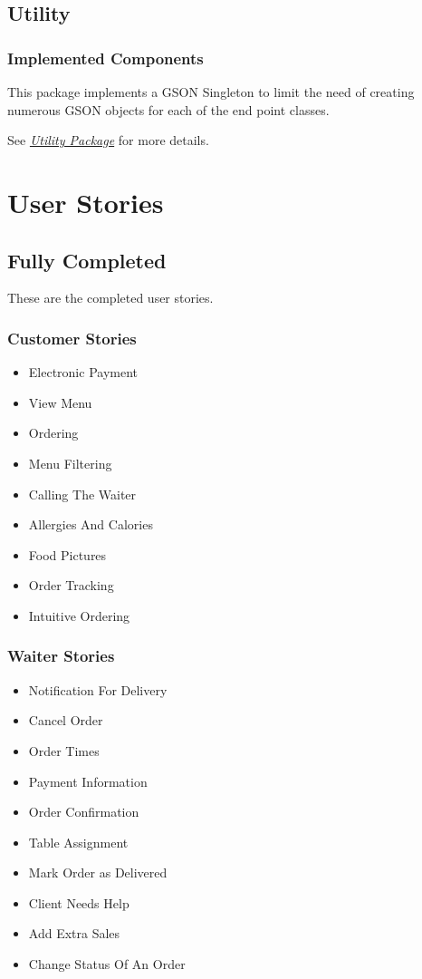 \documentclass[12pt, twoside, a4paper]{report}
\begin{document}
\section*{Utility}\label{sec:util}
\subsection*{Implemented Components}
This package implements a GSON Singleton to limit the need of creating numerous GSON objects for each of the end point classes.

See \textit{\href{run:../JavaDoc/util/package-summary.html}{Utility Package}} for more details.

\chapter*{User Stories}
\section*{Fully Completed}
These are the completed user stories.
\subsection*{Customer Stories}
\begin{itemize}
  \item Electronic Payment
  \item View Menu
  \item Ordering
  \item Menu Filtering
  \item Calling The Waiter
  \item Allergies And Calories
  \item Food Pictures
  \item Order Tracking
  \item Intuitive Ordering
\end{itemize}

\subsection*{Waiter Stories}
\begin{itemize}
  \item Notification For Delivery
  \item Cancel Order
  \item Order Times
  \item Payment Information
  \item Order Confirmation
  \item Table Assignment
  \item Mark Order as Delivered
  \item Client Needs Help
  \item Add Extra Sales
  \item Change Status Of An Order
\end{itemize}
\end{document}
